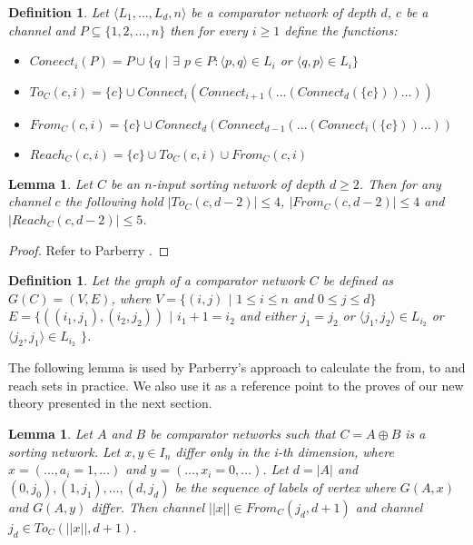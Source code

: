 \documentclass[13pt,a4paper]{article}
\newtheorem{lemma}[theorem]{Lemma}
\newtheorem{definition}[theorem]{Definition}
\begin{document}
\begin{definition}
\label{def:connect}
Let $\langle L_1, \dots, L_d, n \rangle $ be a comparator network of depth $d$, $c$ be a channel and $P \subseteq \{1, 2, \dots, n \}$ then for every $i \geq 1$ define the functions:
\begin{itemize}
\item $Coneect_i(P) = P \cup \{ q$ $\lvert$ $\exists$ $p \in P : \langle p, q \rangle \in L_i$ or $\langle q, p \rangle \in L_i \}$
\item $To_C(c, i) = \{c\} \cup Connect_{i}( Connect_{i+1}( \dots ( Connect_d ( \{c\} ) ) \dots ) )$
\item $From_C(c, i) = \{c\} \cup Connect_{d}( Connect_{d - 1}( \dots ( Connect_i ( \{c\} ) ) \dots ) )$
\item $Reach_C(c, i) = \{c\} \cup To_C(c, i) \cup From_C(c, i)$
\end{itemize}
\end{definition}

\begin{lemma}
\label{lem:reach_2}
Let $C$ be an $n$-input sorting network of depth $d \geq 2$. Then for any channel $c$ the following hold $\lvert To_C(c, d - 2) \lvert \leq 4$, $\lvert From_C(c, d - 2) \lvert \leq 4$ and $\lvert Reach_C(c, d - 2) \lvert \leq 5$.
\end{lemma}

\begin{proof}
Refer to Parberry \cite{Parberry89}.
\end{proof}

\begin{definition}
Let the graph of a comparator network $C$ be defined as $G(C) = (V, E)$, where \newline
$V = \{ (i,j)$ $\lvert$ $1 \leq i \leq n$ and $0 \leq j \leq d \}$ \newline
$E = \{ ((i_1,j_1),(i_2,j_2))$ $\lvert$ $i_1 + 1 = i_2$ and either $j_1 = j_2$ or $ \langle j_1,j_2 \rangle \in L_{i_2} $ or $ \langle j_2,j_1 \rangle \in L_{i_2} $ $ \}$.
\end{definition}

The following lemma is used by Parberry's approach to calculate the from, to and reach sets in practice. We also use it as a reference point to the proves of our new theory presented in the next section.

\begin{lemma}
\label{lem:SortableInTwoLevelsParberry}
Let $A$ and $B$ be comparator networks such that $C = A \oplus B$ is a sorting network. Let $x, y \in I_n$ differ only in the i-th dimension, where $x = (\dots, a_i = 1, \dots)$ and $y = (\dots, x_i = 0, \dots)$. Let $d = \lvert A \lvert$ and $(0, j_0), (1, j_1), \dots, (d, j_d)$ be the sequence of labels of vertex where $G(A, x)$ and $G(A, y)$ differ. Then channel $||x|| \in From_C(j_d, d+1)$ and channel $j_d \in To_C(||x||, d+1)$.
\end{lemma}
\end{document}
